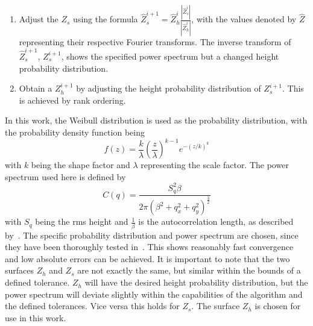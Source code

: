 \begin{enumerate}
    \item Adjust the $Z_s$ using the formula $\hat{Z}_s^{i+1} = \hat{Z}_h^i \frac{|\hat{Z}_s^i|}{|\hat{Z}_h^i|}$, with the values denoted by $\hat{Z}$ representing their respective Fourier transforms.
    The inverse transform of $\hat{Z}_s^{i+1}$, $Z_s^{i+1}$, shows the specified power spectrum but a changed height probability distribution.
    \item Obtain a $Z_h^{i+1}$ by adjusting the height probability distribution of $Z_s^{i+1}$.
    This is achieved by rank ordering.
\end{enumerate}
In this work, the Weibull distribution is used as the probability distribution, with the probability density function being
\begin{equation}\label{eq: Weibull distribution}
    f(z) = \frac{k}{\lambda} \left(\frac{z}{\lambda}\right)^{k-1} e^{-(z/k)^{k}}
\end{equation}
with $k$ being the shape factor and $\lambda$ representing the scale factor.
The  power spectrum used here is defined by
\begin{equation}\label{eq: Power spectrum}
    C(q) = \frac{S_q^2 \beta}{2\pi\left(\beta^2 + q_x^2+q_y^2\right)^{\frac{3}{2}}}
\end{equation}
with $S_q$ being the rms height and $\frac{1}{\beta}$ is the autocorrelation length, as described by~\cite{perez-rafolsGeneratingRandomlyRough2019}.
The specific probability distribution and power spectrum are chosen, since they have been thoroughly tested in~\cite{perez-rafolsGeneratingRandomlyRough2019}.
This shows reasonably fast convergence and low absolute errors can be achieved.
It is important to note that the two surfaces $Z_h$ and $Z_s$ are not exactly the same, but similar within the bounds of a defined tolerance.
$Z_h$ will have the desired height probability distribution, but the power spectrum will deviate slightly within the capabilities of the algorithm and the defined tolerances.
Vice versa this holds for $Z_s$.
The surface $Z_h$ is chosen for use in this work.


